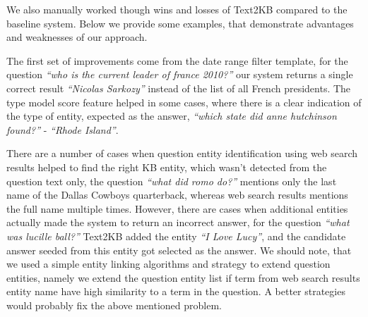 


We also manually worked though wins and losses of Text2KB compared to the baseline system.
Below we provide some examples, that demonstrate advantages and weaknesses of our approach.

The first set of improvements come from the date range filter template, \eg for the question \textit{``who is the current leader of france 2010?''} our system returns a single correct result \textit{``Nicolas Sarkozy''} instead of the list of all French presidents.
The type model score feature helped in some cases, where there is a clear indication of the type of entity, expected as the answer, \eg \textit{``which state did anne hutchinson found?''} - \textit{``Rhode Island''}.

There are a number of cases when question entity identification using web search results helped to find the right KB entity, which wasn't detected from the question text only, \eg the question \textit{``what did romo do?''} mentions only the last name of the Dallas Cowboys quarterback, whereas web search results mentions the full name multiple times.
However, there are cases when additional entities actually made the system to return an incorrect answer, \eg for the question \textit{``what was lucille ball?''} Text2KB added the entity \textit{``I Love Lucy''}, and the candidate answer seeded from this entity got selected as the answer.
We should note, that we used a simple entity linking algorithms and strategy to extend question entities, namely we extend the question entity list if term from web search results entity name have high similarity to a term in the question.
A better strategies would probably fix the above mentioned problem.


